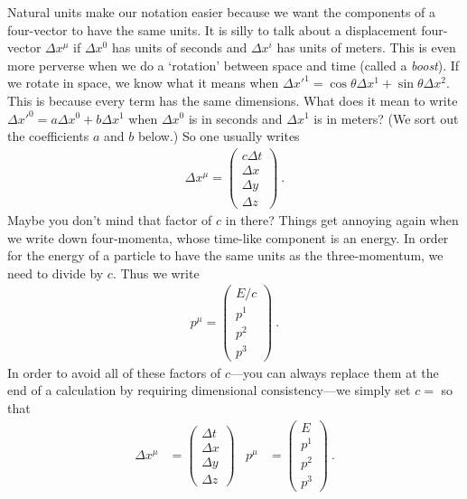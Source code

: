 \documentclass[12pt]{article}
\begin{document}
Natural units make our notation easier because we want the components of a four-vector to have the same units. It is silly to talk about a displacement four-vector $\Delta x^\mu$ if $\Delta x^0$ has units of seconds and $\Delta x^i$ has units of meters. This is even more perverse when we do a `rotation' between space and time (called a \emph{boost}). If we rotate in space, we know what it means when $\Delta x'^1 = \cos\theta \Delta x^1 + \sin\theta \Delta x^2$. This is because every term has the same dimensions. What does it mean to write $\Delta x'^0 = a \Delta x^0 + b \Delta x^1$ when $\Delta x^0$ is in seconds and $\Delta x^1$ is in meters? (We sort out the coefficients $a$ and $b$ below.) So one usually writes 
\begin{align}
    \Delta x^\mu = 
    \begin{pmatrix}
        c\Delta t \\ \Delta x \\ \Delta y \\ \Delta z
    \end{pmatrix} \ .
\end{align}
Maybe you don't mind that factor of $c$ in there? Things get annoying again when we write down four-momenta, whose time-like component is an energy. In order for the energy of a particle to have the same units as the three-momentum, we need to divide by $c$. Thus we write
\begin{align}
    p^\mu = 
    \begin{pmatrix}
        E/c \\
        p^1\\
        p^2\\
        p^3
    \end{pmatrix} \ .
\end{align}
In order to avoid all of these factors of $c$---you can always replace them at the end of a calculation by requiring dimensional consistency---we simply set $c=$ so that
\begin{align}
    \Delta x^\mu &= 
    \begin{pmatrix}
        \Delta t \\ \Delta x \\ \Delta y \\ \Delta z
    \end{pmatrix}
    &
    p^\mu &= 
    \begin{pmatrix}
        E \\
        p^1\\
        p^2\\
        p^3
    \end{pmatrix} \ .
    \label{eq:momentum:4vec}
\end{align}
\end{document}
